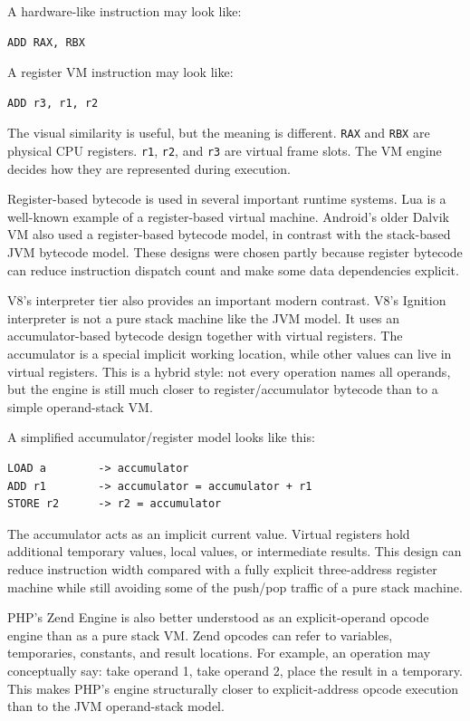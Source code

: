 A hardware-like instruction may look like:

\begin{verbatim}
ADD RAX, RBX
\end{verbatim}

A register VM instruction may look like:

\begin{verbatim}
ADD r3, r1, r2
\end{verbatim}

The visual similarity is useful, but the meaning is different. \texttt{RAX} and \texttt{RBX} are physical CPU registers. \texttt{r1}, \texttt{r2}, and \texttt{r3} are virtual frame slots. The VM engine decides how they are represented during execution.

Register-based bytecode is used in several important runtime systems. Lua is a well-known example of a register-based virtual machine. Android's older Dalvik VM also used a register-based bytecode model, in contrast with the stack-based JVM bytecode model. These designs were chosen partly because register bytecode can reduce instruction dispatch count and make some data dependencies explicit.

V8's interpreter tier also provides an important modern contrast. V8's Ignition interpreter is not a pure stack machine like the JVM model. It uses an accumulator-based bytecode design together with virtual registers. The accumulator is a special implicit working location, while other values can live in virtual registers. This is a hybrid style: not every operation names all operands, but the engine is still much closer to register/accumulator bytecode than to a simple operand-stack VM.

A simplified accumulator/register model looks like this:

\begin{verbatim}
LOAD a        -> accumulator
ADD r1        -> accumulator = accumulator + r1
STORE r2      -> r2 = accumulator
\end{verbatim}

The accumulator acts as an implicit current value. Virtual registers hold additional temporary values, local values, or intermediate results. This design can reduce instruction width compared with a fully explicit three-address register machine while still avoiding some of the push/pop traffic of a pure stack machine.

PHP's Zend Engine is also better understood as an explicit-operand opcode engine than as a pure stack VM. Zend opcodes can refer to variables, temporaries, constants, and result locations. For example, an operation may conceptually say: take operand 1, take operand 2, place the result in a temporary. This makes PHP's engine structurally closer to explicit-address opcode execution than to the JVM operand-stack model.

